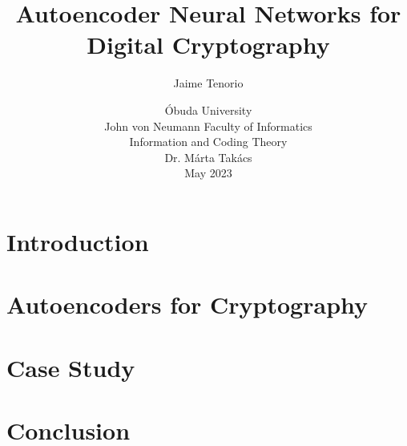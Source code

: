 \documentclass{article}
\title{Autoencoder Neural Networks for Digital Cryptography}
\author{Jaime Tenorio}
\date{
    Óbuda University \\
    John von Neumann Faculty of Informatics \\
    Information and Coding Theory \\
    Dr. Márta Takács \\
    May 2023
}
\begin{document}
\maketitle

\section{Introduction}


\section{Autoencoders for Cryptography}


\section{Case Study}


\section{Conclusion}


\printbibliography
\end{document}
